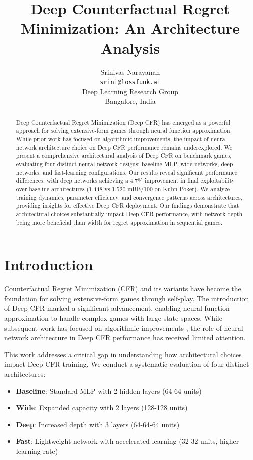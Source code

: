 \documentclass{article}
\title{Deep Counterfactual Regret Minimization: An Architecture Analysis}
\author{
  Srinivas Narayanan\\
  \texttt{srini@lossfunk.ai}\\
  \And
  Deep Learning Research Group\\
  Bangalore, India
}
\begin{document}
\maketitle

\begin{abstract}
Deep Counterfactual Regret Minimization (Deep CFR) has emerged as a powerful approach for solving extensive-form games through neural function approximation. While prior work has focused on algorithmic improvements, the impact of neural network architecture choice on Deep CFR performance remains underexplored. We present a comprehensive architectural analysis of Deep CFR on benchmark games, evaluating four distinct neural network designs: baseline MLP, wide networks, deep networks, and fast-learning configurations. Our results reveal significant performance differences, with deep networks achieving a 4.7\% improvement in final exploitability over baseline architectures (1.448 vs 1.520 mBB/100 on Kuhn Poker). We analyze training dynamics, parameter efficiency, and convergence patterns across architectures, providing insights for effective Deep CFR deployment. Our findings demonstrate that architectural choices substantially impact Deep CFR performance, with network depth being more beneficial than width for regret approximation in sequential games.
\end{abstract}

\section{Introduction}

Counterfactual Regret Minimization (CFR) \cite{zinkevich2007regret} and its variants have become the foundation for solving extensive-form games through self-play. The introduction of Deep CFR \cite{brown2019deep} marked a significant advancement, enabling neural function approximation to handle complex games with large state spaces. While subsequent work has focused on algorithmic improvements \cite{brown2019superhuman,mcaleer2022anytime}, the role of neural network architecture in Deep CFR performance has received limited attention.

This work addresses a critical gap in understanding how architectural choices impact Deep CFR training. We conduct a systematic evaluation of four distinct architectures:

\begin{itemize}
\item \textbf{Baseline}: Standard MLP with 2 hidden layers (64-64 units)
\item \textbf{Wide}: Expanded capacity with 2 layers (128-128 units)
\item \textbf{Deep}: Increased depth with 3 layers (64-64-64 units)
\item \textbf{Fast}: Lightweight network with accelerated learning (32-32 units, higher learning rate)
\end{itemize}
\end{document}
